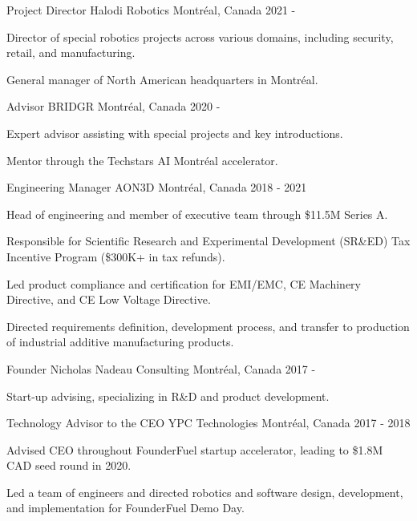 \begin{cventries}

\cventry
{Project Director}
{Halodi Robotics}
{Montréal, Canada}
{2021 - }
{
\begin{cvitems}
\item{Director of special robotics projects across various domains, including security, retail, and manufacturing.}
\item{General manager of North American headquarters in Montréal.}
\end{cvitems}
}

\cventry
{Advisor}
{BRIDGR}
{Montréal, Canada}
{2020 - }
{
\begin{cvitems}
\item{Expert advisor assisting with special projects and key introductions.}
\item{Mentor through the Techstars AI Montréal accelerator.}
\end{cvitems}
}

\cventry
{Engineering Manager}
{AON3D}
{Montréal, Canada}
{2018 - 2021}
{
\begin{cvitems}
\item{Head of engineering and member of executive team through \$11.5M Series A.}
\item{Responsible for Scientific Research and Experimental Development (SR\&ED) Tax Incentive Program (\$300K+ in tax refunds).}
\item{Led product compliance and certification for EMI/EMC, CE Machinery Directive, and CE Low Voltage Directive.}
\item{Directed requirements definition, development process, and transfer to production of industrial additive manufacturing products.}
\end{cvitems}
}

\cventry
{Founder}
{Nicholas Nadeau Consulting}
{Montréal, Canada}
{2017 - }
{
\begin{cvitems}
\item{Start-up advising, specializing in R\&D and product development.}
\end{cvitems}
}

\cventry
{Technology Advisor to the CEO}
{YPC Technologies}
{Montréal, Canada}
{2017 - 2018}
{
\begin{cvitems}
\item{Advised CEO throughout FounderFuel startup accelerator, leading to \$1.8M CAD seed round in 2020.}
\item{Led a team of engineers and directed robotics and software design, development, and implementation for FounderFuel Demo Day.}
\end{cvitems}
}


\end{cventries}

